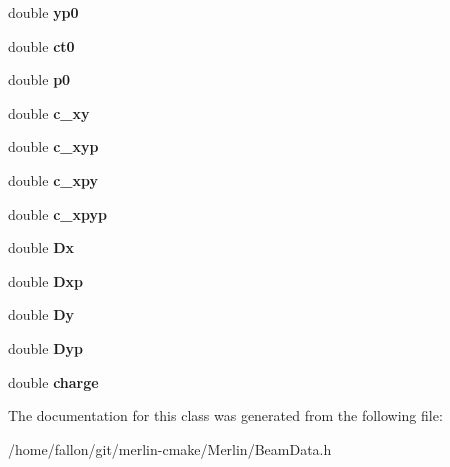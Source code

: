\begin{DoxyCompactItemize}
double {\bfseries yp0}
\item 
\mbox{\label{classBeamData_aaf403be214b8a4edfe85b59d1b023a8e}} 
double {\bfseries ct0}
\item 
\mbox{\label{classBeamData_a638cbb6fbd46a12a44492b88eb94016a}} 
double {\bfseries p0}
\item 
\mbox{\label{classBeamData_a4bb725a9908083b6a8d2e09db5bae93f}} 
double {\bfseries c\+\_\+xy}
\item 
\mbox{\label{classBeamData_a2dd71a41d153b6724685190826df62f9}} 
double {\bfseries c\+\_\+xyp}
\item 
\mbox{\label{classBeamData_a2862e30484c8adffe41eac6882fc208f}} 
double {\bfseries c\+\_\+xpy}
\item 
\mbox{\label{classBeamData_a2479aaa6b075a182e89bf924323caa41}} 
double {\bfseries c\+\_\+xpyp}
\item 
\mbox{\label{classBeamData_a9f6987dae37a0c6d13f701b3af6a1286}} 
double {\bfseries Dx}
\item 
\mbox{\label{classBeamData_a9f4efcc8951fd3a7045a4291e6ae0004}} 
double {\bfseries Dxp}
\item 
\mbox{\label{classBeamData_ad3ed1445bc60061ec94ea986d1723d5c}} 
double {\bfseries Dy}
\item 
\mbox{\label{classBeamData_a93ebce129459bf8650648047c6924d5d}} 
double {\bfseries Dyp}
\item 
\mbox{\label{classBeamData_ac779e54adef56269a2a21ec3cfb18211}} 
double {\bfseries charge}
\end{DoxyCompactItemize}


The documentation for this class was generated from the following file\+:\begin{DoxyCompactItemize}
\item 
/home/fallon/git/merlin-\/cmake/\+Merlin/Beam\+Data.\+h\end{DoxyCompactItemize}
